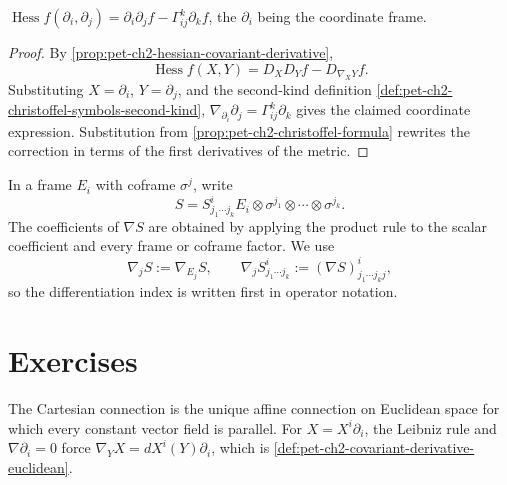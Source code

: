 \begin{proposition}
  \label{prop:pet-ch2-hessian-coordinate-formula}


  $\operatorname{Hess}f(\partial_i,\partial_j)=\partial_i\partial_jf-\Gamma^k_{ij}\partial_kf$,
  the $\partial_i$ being the coordinate frame.
\end{proposition}
\begin{proof}

  \sketch
  By
  \cref{prop:pet-ch2-hessian-covariant-derivative},
  \[
    \operatorname{Hess}f(X,Y)
      =D_XD_Yf-D_{\nabla_XY}f.
  \]
  Substituting $X=\partial_i$, $Y=\partial_j$, and the second-kind definition
  \cref{def:pet-ch2-christoffel-symbols-second-kind},
  $\nabla_{\partial_i}\partial_j=\Gamma^k_{ij}\partial_k$ gives the claimed
  coordinate expression. Substitution from
  \cref{prop:pet-ch2-christoffel-formula} rewrites the correction in terms of
  the first derivatives of the metric.
\end{proof}

\begin{definition}
  \label{def:pet-ch2-covariant-derivative-index-notation}


  In a frame $E_i$
  with coframe $\sigma^j$, write
  \[
    S=S^i_{j_1\cdots j_k}
      E_i\otimes\sigma^{j_1}\otimes\cdots\otimes\sigma^{j_k}.
  \]
  The coefficients of $\nabla S$ are obtained by applying the product rule to
  the scalar coefficient and every frame or coframe factor. We use
  \[
    \nabla_jS:=\nabla_{E_j}S,\qquad
    \nabla_jS^i_{j_1\cdots j_k}
      :=(\nabla S)^i_{j_1\cdots j_kj},
  \]
  so the differentiation index is written first in operator notation.
\end{definition}

\section{Exercises}

\begin{remark}
  \label{rem:pet-ch2-ex-1}


  The Cartesian connection is the unique affine
  connection on Euclidean space for which every constant vector field is
  parallel.
  \sketch
  For $X=X^i\partial_i$, the Leibniz rule and
  $\nabla\partial_i=0$ force
  $\nabla_YX=dX^i(Y)\partial_i$, which is
  \cref{def:pet-ch2-covariant-derivative-euclidean}.
\end{remark}

